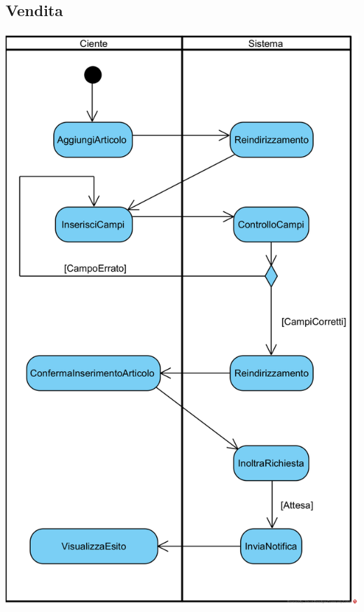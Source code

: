 \documentclass[12pt,a4paper]{article}
\begin{document}
\subsection{Vendita}
\begin{center}
\includegraphics[height=0.95\textheight]{ActivityDiagram/VenditaCliente}
\end{center}
\end{document}
